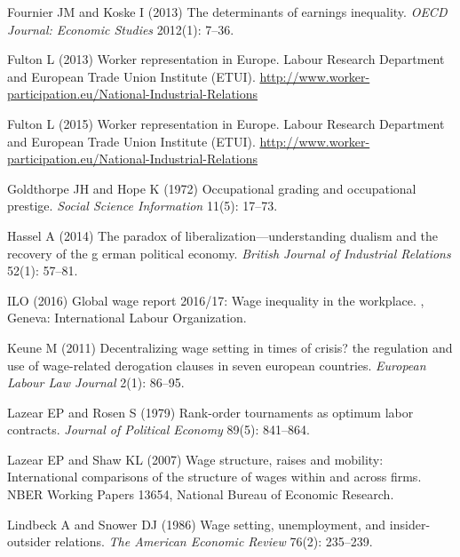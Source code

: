 \documentclass[12pt]{article}
\begin{document}
\begin{thebibliography}{38}
Fournier JM and Koske I (2013) The determinants of earnings inequality.
\newblock \emph{OECD Journal: Economic Studies} 2012(1): 7--36.

Fulton L (2013) Worker representation in Europe.
\newblock Labour Research Department and European Trade Union Institute (ETUI).
\newblock \urlprefix\url{http://www.worker-participation.eu/National-Industrial-Relations}

Fulton L (2015) Worker representation in Europe.
\newblock Labour Research Department and European Trade Union Institute (ETUI).
\newblock \urlprefix\url{http://www.worker-participation.eu/National-Industrial-Relations}

Goldthorpe JH and Hope K (1972) Occupational grading and occupational prestige.
\newblock \emph{Social Science Information} 11(5): 17--73.

Hassel A (2014) The paradox of liberalization—understanding dualism and the
  recovery of the g erman political economy.
\newblock \emph{British Journal of Industrial Relations} 52(1): 57--81.

{ILO} (2016) Global wage report 2016/17: Wage inequality in the workplace.
, Geneva: International
  Labour Organization.

Keune M (2011) Decentralizing wage setting in times of crisis? the regulation
  and use of wage-related derogation clauses in seven european countries.
\newblock \emph{European Labour Law Journal} 2(1): 86--95.

Lazear EP and Rosen S (1979) Rank-order tournaments as optimum labor contracts.
\newblock \emph{Journal of Political Economy} 89(5): 841--864.

Lazear EP and Shaw KL (2007) Wage structure, raises and mobility: International
  comparisons of the structure of wages within and across firms.
\newblock NBER Working Papers 13654, National Bureau of Economic Research.

Lindbeck A and Snower DJ (1986) Wage setting, unemployment, and
  insider-outsider relations.
\newblock \emph{The American Economic Review} 76(2): 235--239.


\end{thebibliography}
\end{document}
